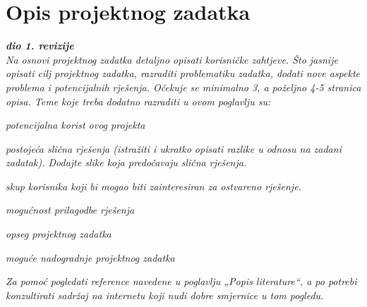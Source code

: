 \chapter{Opis projektnog zadatka}
		
		\textbf{\textit{dio 1. revizije}}\\
		
		\textit{Na osnovi projektnog zadatka detaljno opisati korisničke zahtjeve. Što jasnije opisati cilj projektnog zadatka, razraditi problematiku zadatka, dodati nove aspekte problema i potencijalnih rješenja. Očekuje se minimalno 3, a poželjno 4-5 stranica opisa.	Teme koje treba dodatno razraditi u ovom poglavlju su:}
		\begin{packed_item}
			\item \textit{potencijalna korist ovog projekta}
			\item \textit{postojeća slična rješenja (istražiti i ukratko opisati razlike u odnosu na zadani zadatak). Dodajte slike koja predočavaju slična rješenja.}
			\item \textit{skup korisnika koji bi mogao biti zainteresiran za ostvareno rješenje.}
			\item \textit{mogućnost prilagodbe rješenja }
			\item \textit{opseg projektnog zadatka}
			\item \textit{moguće nadogradnje projektnog zadatka}
		\end{packed_item}
		
		\textit{Za pomoć pogledati reference navedene u poglavlju „Popis literature“, a po potrebi konzultirati sadržaj na internetu koji nudi dobre smjernice u tom pogledu.}
		\eject
		
		

		
